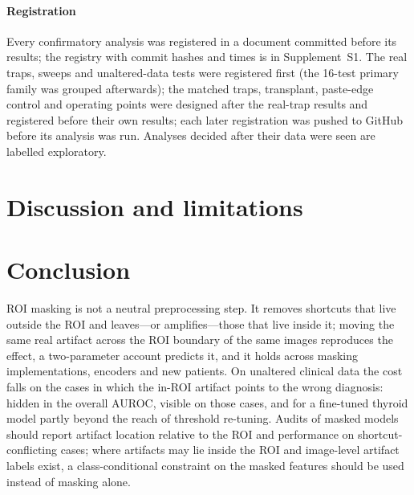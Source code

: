 \documentclass[review,3p]{elsarticle}
\begin{document}
\paragraph{Registration} Every confirmatory analysis was registered in a document committed before its results; the registry with
commit hashes and times is in Supplement~S1. The real traps, sweeps and unaltered-data tests were registered first (the
16-test primary family was grouped afterwards); the matched traps, transplant, paste-edge control and operating points
were designed after the real-trap results and registered before their own results; each later registration was
pushed to GitHub before its analysis was run. Analyses decided after their data were seen are labelled
exploratory.









\section{Discussion and limitations}\label{sec:limits}


\section{Conclusion}
ROI masking is not a neutral preprocessing step. It removes shortcuts that live outside the ROI and leaves---or
amplifies---those that live inside it; moving the same real artifact across the ROI boundary of the same images
reproduces the effect, a two-parameter account predicts it, and it holds across masking implementations, encoders and
new patients. On unaltered clinical data the cost falls on the cases in which the in-ROI artifact points to the wrong
diagnosis: hidden in the overall AUROC, visible on those cases, and for a fine-tuned thyroid model partly beyond the reach
of threshold re-tuning. Audits of masked models should report artifact location relative to the ROI and performance on
shortcut-conflicting cases; where artifacts may lie inside the ROI and image-level artifact labels exist, a
class-conditional constraint on the masked features should be used instead of masking alone.



\end{document}
